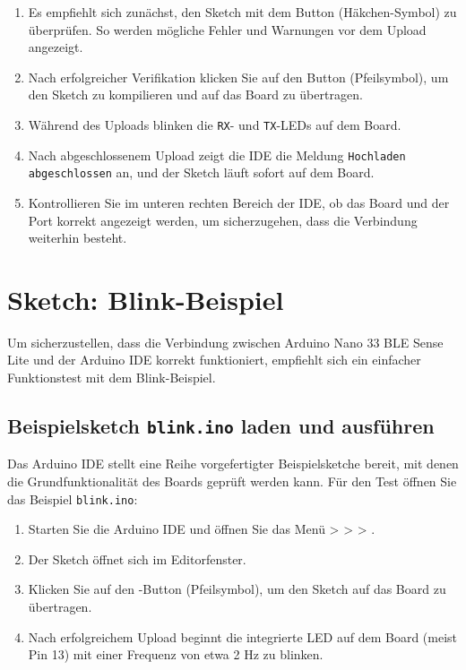 \begin{enumerate}
	\item Es empfiehlt sich zunächst, den Sketch mit dem Button  (Häkchen-Symbol) zu überprüfen. So werden mögliche Fehler und Warnungen vor dem Upload angezeigt.
	\item Nach erfolgreicher Verifikation klicken Sie auf den Button  (Pfeilsymbol), um den Sketch zu kompilieren und auf das Board zu übertragen.
	\item Während des Uploads blinken die \texttt{RX}- und \texttt{TX}-LEDs auf dem Board.
	\item Nach abgeschlossenem Upload zeigt die IDE die Meldung \texttt{Hochladen abgeschlossen} an, und der Sketch läuft sofort auf dem Board.
	\item Kontrollieren Sie im unteren rechten Bereich der IDE, ob das Board und der Port korrekt angezeigt werden, um sicherzugehen, dass die Verbindung weiterhin besteht.
\end{enumerate}

\section{Sketch: Blink-Beispiel}
Um sicherzustellen, dass die Verbindung zwischen Arduino Nano 33 BLE Sense Lite und der Arduino IDE korrekt funktioniert, empfiehlt sich ein einfacher Funktionstest mit dem Blink-Beispiel.

\subsection{Beispielsketch \texttt{blink.ino} laden und ausführen}

Das Arduino IDE stellt eine Reihe vorgefertigter Beispielsketche bereit, mit denen die Grundfunktionalität des Boards geprüft werden kann. Für den Test öffnen Sie das Beispiel \texttt{blink.ino}:

\begin{enumerate}
	\item Starten Sie die Arduino IDE und öffnen Sie das Menü  >  >  > .
	\item Der Sketch öffnet sich im Editorfenster.
	\item Klicken Sie auf den -Button (Pfeilsymbol), um den Sketch auf das Board zu übertragen.
	\item Nach erfolgreichem Upload beginnt die integrierte LED auf dem Board (meist Pin 13) mit einer Frequenz von etwa 2 Hz zu blinken.
\end{enumerate}

